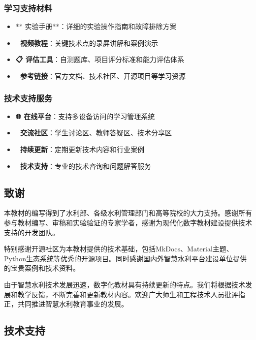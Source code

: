 \subsubsection{学习支持材料}\label{ux5b66ux4e60ux652fux6301ux6750ux6599}

\begin{itemize}
\tightlist
\item
  ** 实验手册**：详细的实验操作指南和故障排除方案
\item
  \textbf{🎥 视频教程}：关键技术点的录屏讲解和案例演示
\item
  \textbf{📋 评估工具}：自测题库、项目评分标准和能力评估体系
\item
  \textbf{🔗 参考链接}：官方文档、技术社区、开源项目等学习资源
\end{itemize}

\subsubsection{技术支持服务}\label{ux6280ux672fux652fux6301ux670dux52a1}

\begin{itemize}
\tightlist
\item
  \textbf{🌐 在线平台}：支持多设备访问的学习管理系统
\item
  \textbf{💬 交流社区}：学生讨论区、教师答疑区、技术分享区
\item
  \textbf{🚀 持续更新}：定期更新技术内容和行业案例
\item
  \textbf{📧 技术支持}：专业的技术咨询和问题解答服务
\end{itemize}

\subsection{致谢}\label{ux81f4ux8c22}

本教材的编写得到了水利部、各级水利管理部门和高等院校的大力支持。感谢所有参与教材编写、审稿和实验验证的专家学者，感谢为现代化数字教材建设提供技术支持的开发团队。

特别感谢开源社区为本教材提供的技术基础，包括MkDocs、Material主题、Python生态系统等优秀的开源项目。同时感谢国内外智慧水利平台建设单位提供的宝贵案例和技术资料。

由于智慧水利技术发展迅速，数字化教材具有持续更新的特点。我们将根据技术发展和教学反馈，不断完善和更新教材内容。欢迎广大师生和工程技术人员批评指正，共同推进智慧水利教育事业的发展。

\subsection{技术支持}\label{ux6280ux672fux652fux6301}

